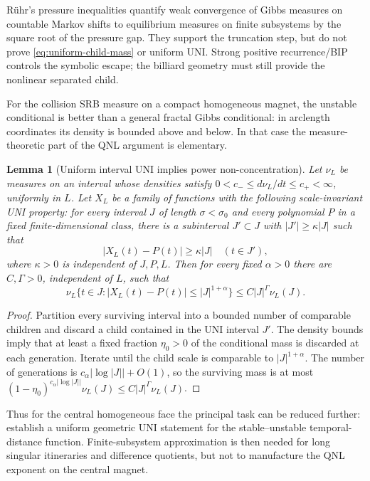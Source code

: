 \documentclass[11pt]{article}
\newtheorem{lemma}[theorem]{Lemma}
\begin{document}
R\"uhr's pressure inequalities quantify weak convergence of Gibbs measures
on countable Markov shifts to equilibrium measures on finite subsystems by
the square root of the pressure gap.  They support the truncation step, but
do not prove \eqref{eq:uniform-child-mass} or uniform UNI.  Strong positive
recurrence/BIP controls the symbolic escape; the billiard geometry must still
provide the nonlinear separated child.

For the collision SRB measure on a compact homogeneous magnet, the unstable
conditional is better than a general fractal Gibbs conditional: in arclength
coordinates its density is bounded above and below.  In that case the
measure-theoretic part of the QNL argument is elementary.

\begin{lemma}[Uniform interval UNI implies power non-concentration]
\label{lem:interval-uni-qnl}
Let $\nu_L$ be measures on an interval whose densities satisfy
$0<c_-\le d\nu_L/dt\le c_+<\infty$, uniformly in $L$.  Let $X_L$ be a family
of functions with the following scale-invariant UNI property: for every
interval $J$ of length $\sigma<\sigma_0$ and every polynomial $P$ in a fixed
finite-dimensional class, there is a subinterval
$J'\subset J$ with $|J'|\ge\kappa|J|$ such that
\[
 |X_L(t)-P(t)|\ge\kappa|J|\quad(t\in J'),
\]
where $\kappa>0$ is independent of $J,P,L$.  Then for every fixed
$\alpha>0$ there are $C,\Gamma>0$, independent of $L$, such that
\[
 \nu_L\{t\in J:|X_L(t)-P(t)|\le |J|^{1+\alpha}\}
 \le C|J|^\Gamma\nu_L(J).
\]
\end{lemma}

\begin{proof}
Partition every surviving interval into a bounded number of comparable
children and discard a child contained in the UNI interval $J'$.  The density
bounds imply that at least a fixed fraction $\eta_0>0$ of the conditional
mass is discarded at each generation.  Iterate until the child scale is
comparable to $|J|^{1+\alpha}$.  The number of generations is
$c_\alpha|\log|J||+O(1)$, so the surviving mass is at most
$(1-\eta_0)^{c_\alpha|\log|J||}\nu_L(J)
\le C|J|^\Gamma\nu_L(J)$.
\end{proof}

Thus for the central homogeneous face the principal task can be reduced
further: establish a uniform geometric UNI statement for the
stable--unstable temporal-distance function.  Finite-subsystem approximation
is then needed for long singular itineraries and difference quotients, but
not to manufacture the QNL exponent on the central magnet.
\end{document}
